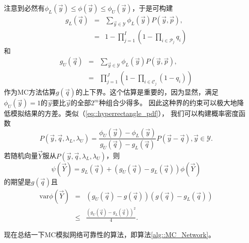 注意到必然有$\phi_L(\vec{y}) \leq \phi(\vec{y}) \leq \phi_U(\vec{y})$，于是可构建
\begin{equation}
  \begin{array}{rcl}
  g_L(\vec{q}) &=&\displaystyle \sum_{\vec{y} \in \mathscr{Y}}
  \phi_L(\vec{y}) P(\vec{y}, \vec{p}),\\ &=&\displaystyle 1 - \prod_{j
    = 1}^I\left(1 - \prod_{i \in \mathscr{P}_j}q_i\right)
  \end{array}
  \label{eq::network_gl}
\end{equation}
和
\begin{equation}
  \begin{array}{rcl}
  g_U(\vec{q}) &=&\displaystyle \sum_{\vec{y} \in \mathscr{Y}}
  \phi_L(\vec{y}) P(\vec{y}, \vec{p}),\\ &=&\displaystyle
  \prod_{j = 1}^J\left(1 - \prod_{i \in \mathscr{C}_j}(1 - q_i)\right)
  \end{array}
  \label{eq::network_gu}
\end{equation}
作为MC方法估算$g(\vec{q})$的上下界。这个估算是重要的，因为显然，满足
$\phi_U(\vec{y}) = 1$的$\vec{y}$要比$\vec{y}$的全部$2^m$种组合少得多。
因此这种界的约束可以极大地降低模拟结果的方差。类似（\ref{eq::hyperrectangle_pdf}），
我们可以构建概率密度函数
\begin{equation}
  P(\vec{y}, \vec{q}, \lambda_L, \lambda_U) = \frac{\phi_U(\vec{y}) -
    \phi_L(\vec{y})}{g_U(\vec{q}) - g_L(\vec{q})}P(\vec{y} - \vec{q}), \vec{y}
  \in \mathscr{Y}.
  \label{eq::network_bound_pdf}
\end{equation}
若随机向量$\vec{Y}$服从$P(\vec{y}, \vec{q}, \lambda_L, \lambda_U)$，则
\begin{equation}
  \psi(\vec{Y}) = g_L(\vec{q}) + (g_U(\vec{q}) - g_L(\vec{q})) \phi(\vec{Y})
  \label{eq::network_bound_estimate_g}
\end{equation}
的期望是$g(\vec{q})$且
\begin{equation}
  \begin{array}{rcl}
  \mathrm{var} \phi(\vec{Y}) &=& (g_U(\vec{q}) - g(\vec{q}))
  (g(\vec{q}) - g_L(\vec{q}))\\
  & \leq& \displaystyle \frac{(g_U(\vec{q}) - g_L(\vec{q}))^2}{4}.
  \end{array}
  \label{eq::network_bound_estimate_var}
\end{equation}

现在总结一下MC模拟网络可靠性的算法，即算法\ref{alg::MC_Network}。

